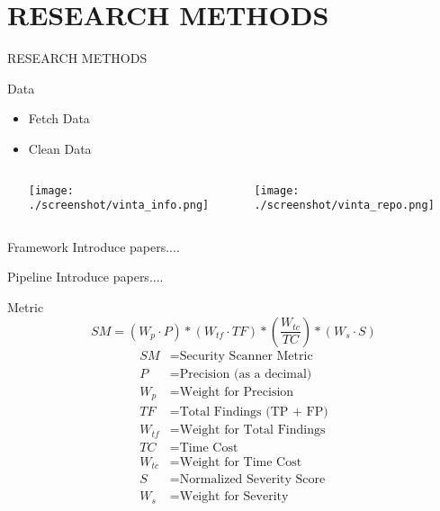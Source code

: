 \section{RESEARCH METHODS}
\begin{frame}[allowframebreaks]{RESEARCH METHODS}
  \begin{block}{Data}
    \begin{itemize}
      \item Fetch Data
      \item Clean Data
    \begin{columns}
      \centering
      \texttt{[image: ./screenshot/vinta\_info.png]}

      \centering
      \texttt{[image: ./screenshot/vinta\_repo.png]}
    \end{columns}
      
      
    \end{itemize}  
  \end{block}
  \framebreak
  \begin{block}{Framework}
    Introduce papers....
  \end{block}
  \begin{block}{Pipeline}
    Introduce papers....
  \end{block}
  \framebreak
  \begin{block}{Metric}
    \begin{equation}
      SM = (W_p \cdot P) * (W_{tf} \cdot TF) * (\frac{W_{tc}}{TC}) * (W_s \cdot S)
    \end{equation}
    \begin{align*}
      SM & = \text{Security Scanner Metric} \\
      P & = \text{Precision (as a decimal)} \\
      W_p & = \text{Weight for Precision} \\
      TF & = \text{Total Findings (TP + FP)} \\
      W_{tf} & = \text{Weight for Total Findings} \\
      TC & = \text{Time Cost} \\
      W_{tc} & = \text{Weight for Time Cost} \\
      S & = \text{Normalized Severity Score} \\
      W_s & = \text{Weight for Severity}
    \end{align*}
  \end{block}
\end{frame}